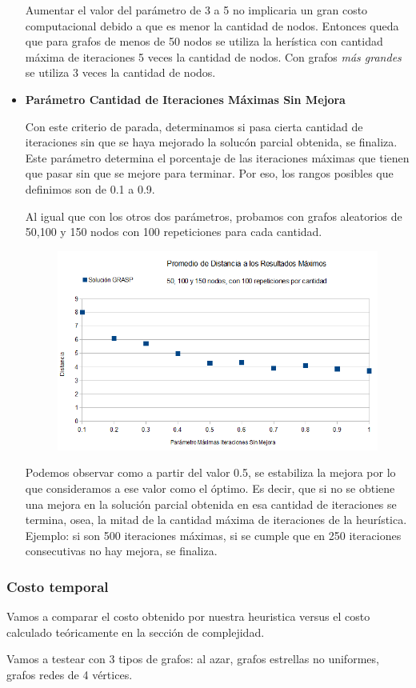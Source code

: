 \begin{itemize}
\quad Aumentar el valor del parámetro de 3 a 5 no implicaria un gran costo computacional debido a que es menor la cantidad de nodos. Entonces queda que para grafos de menos de 50 nodos se utiliza la herística con cantidad máxima de iteraciones 5 veces la cantidad de nodos. Con grafos \textit{más grandes} se utiliza 3 veces la cantidad de nodos.

\item \textbf{Parámetro Cantidad de Iteraciones Máximas Sin Mejora}

\quad

\quad Con este criterio de parada, determinamos si pasa cierta cantidad de iteraciones sin que se haya mejorado la solucón parcial obtenida, se finaliza. Este parámetro determina el porcentaje de las iteraciones máximas que tienen que pasar sin que se mejore para terminar. Por eso, los rangos posibles que definimos son de 0.1 a 0.9.

\quad Al igual que con los otros dos parámetros, probamos con grafos aleatorios de 50,100 y 150 nodos con 100 repeticiones para cada cantidad.

\begin{figure}[H]
	\centering
	\includegraphics[scale=0.6]{optimizacionGRASPParIterMaxSinMejora.png}
\end{figure}

\quad Podemos observar como a partir del valor 0.5, se estabiliza la mejora por lo que consideramos a ese valor como el óptimo. Es decir, que si no se obtiene una mejora en la solución parcial obtenida en esa cantidad de iteraciones se termina, osea, la mitad de la cantidad máxima de iteraciones de la heurística. Ejemplo: si son 500 iteraciones máximas, si se cumple que en 250 iteraciones consecutivas no hay mejora, se finaliza.

\end{itemize}

\subsubsection{Costo temporal}

\quad Vamos a comparar el costo obtenido por nuestra heuristica versus el costo calculado teóricamente en la sección de complejidad.

\quad Vamos a testear con 3 tipos de grafos: al azar, grafos estrellas no uniformes, grafos redes de 4 vértices.